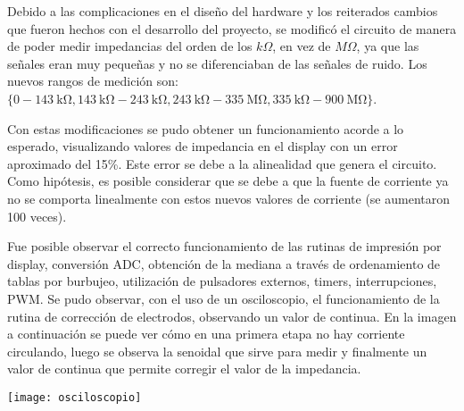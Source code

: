 Debido a las complicaciones en el diseño del hardware y los reiterados cambios que fueron hechos con el desarrollo del proyecto, se modificó el circuito de manera de poder medir impedancias del orden de los $k\Omega$, en vez de $M\Omega$, ya que las señales eran muy pequeñas y no se diferenciaban de las señales de ruido. Los nuevos rangos de medición son: $\{0-\SI{143}{\kilo\ohm}, \SI{143}{\kilo\ohm}-\SI{243}{\kilo\ohm}, \SI{243}{\kilo\ohm}-\SI{335}{\mega\ohm}, \SI{335}{\kilo\ohm}-\SI{900}{\mega\ohm}\}$.
 
Con estas modificaciones se pudo obtener un funcionamiento acorde a lo esperado, visualizando valores de impedancia en el display con un error aproximado del 15\%. Este error se debe a la alinealidad que genera el circuito. Como hipótesis, es posible considerar que se debe a que la fuente de corriente ya no se comporta linealmente con estos nuevos valores de corriente (se aumentaron 100 veces). 

Fue posible observar el correcto funcionamiento de las rutinas de impresión por display, conversión ADC, obtención de la mediana a través de ordenamiento de tablas por burbujeo, utilización de pulsadores externos, timers, interrupciones, PWM. Se pudo observar, con el uso de un osciloscopio, el funcionamiento de la rutina de corrección de electrodos, observando un valor de continua. En la imagen a continuación se puede ver cómo en una primera etapa no hay corriente circulando, luego se observa la senoidal que sirve para medir y finalmente un valor de continua que permite corregir el valor de la impedancia. 

\hspace{-1cm}
\texttt{[image: osciloscopio]}

